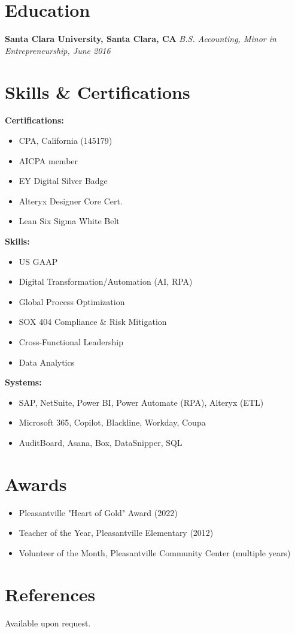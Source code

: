 \documentclass[10pt,a4paper]{article}
\begin{document}
\section*{Education}
\textbf{Santa Clara University, Santa Clara, CA} \hfill \textit{B.S. Accounting, Minor in Entrepreneurship, June 2016}

\section*{Skills \& Certifications}
\begin{multicols}{2}
\textbf{Certifications:}
\begin{itemize}[leftmargin=*, itemsep=0.1em, topsep=0.1em]
    \item CPA, California (145179)
    \item AICPA member
    \item EY Digital Silver Badge
    \item Alteryx Designer Core Cert.
    \item Lean Six Sigma White Belt
\end{itemize}

\textbf{Skills:}
\begin{itemize}[leftmargin=*, itemsep=0.1em, topsep=0.1em]
    \item US GAAP
    \item Digital Transformation/Automation (AI, RPA)
    \item Global Process Optimization
    \item SOX 404 Compliance \& Risk Mitigation
    \item Cross-Functional Leadership
    \item Data Analytics
\end{itemize}

\textbf{Systems:}
\begin{itemize}[leftmargin=*, itemsep=0.1em, topsep=0.1em]
    \item SAP, NetSuite, Power BI, Power Automate (RPA), Alteryx (ETL)
    \item Microsoft 365, Copilot, Blackline, Workday, Coupa
    \item AuditBoard, Asana, Box, DataSnipper, SQL
\end{itemize}
\end{multicols}

\section*{Awards}
\begin{itemize}[leftmargin=*, itemsep=0.1em, topsep=0.1em]
    \item Pleasantville "Heart of Gold" Award (2022)
    \item Teacher of the Year, Pleasantville Elementary (2012)
    \item Volunteer of the Month, Pleasantville Community Center (multiple years)
\end{itemize}

\section*{References}
Available upon request.
\end{document}
